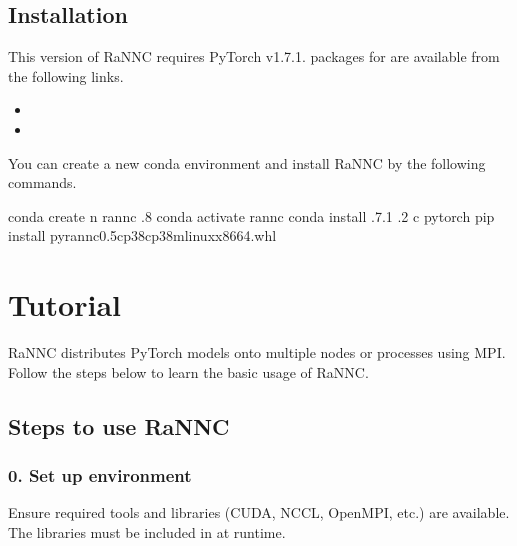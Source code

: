\documentclass[letterpaper,10pt,english]{sphinxmanual}
\begin{document}
\section{Installation}
\label{\detokenize{installation:id1}}
This version of RaNNC requires PyTorch v1.7.1.
 packages for  are available from the following links.
\begin{itemize}
\item {} 

\item {} 

\end{itemize}

You can create a new conda environment and install RaNNC by the following commands.

\begin{sphinxVerbatim}[commandchars=\\\{\}]
conda create \PYGZhy{}n rannc .8
conda activate rannc
conda install .7.1 .2 \PYGZhy{}c pytorch
pip install pyrannc\PYGZhy{}0.5\PYGZhy{}cp38\PYGZhy{}cp38m\PYGZhy{}linux\PYGZus{}x86\PYGZus{}64.whl
\end{sphinxVerbatim}


\chapter{Tutorial}
\label{\detokenize{tutorial:tutorial}}\label{\detokenize{tutorial::doc}}
RaNNC distributes PyTorch models onto multiple nodes or processes using MPI.
Follow the steps below to learn the basic usage of RaNNC.


\section{Steps to use RaNNC}
\label{\detokenize{tutorial:steps-to-use-rannc}}

\subsection{0. Set up environment}
\label{\detokenize{tutorial:set-up-environment}}
Ensure required tools and libraries (CUDA, NCCL, OpenMPI, etc.) are available.
The libraries must be included in  at runtime.
\end{document}
